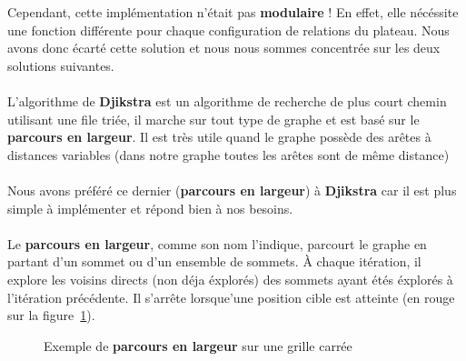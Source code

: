 \documentclass{article}
\begin{document}
Cependant, cette implémentation n'était pas \textbf{modulaire} ! En effet, elle nécéssite une fonction différente pour chaque configuration de relations du plateau.
Nous avons donc écarté cette solution et nous nous sommes concentrée sur les deux solutions suivantes.
\\\\
L'algorithme de \textbf{Djikstra} est un algorithme de recherche de plus court chemin utilisant une file triée, 
il marche sur tout type de graphe et est basé sur le \textbf{parcours en largeur}.
Il est très utile quand le graphe possède des arêtes à distances variables (dans notre graphe toutes les arêtes sont de même distance)
\\\\
Nous avons préféré ce dernier (\textbf{parcours en largeur}) à \textbf{Djikstra} car il est plus simple à implémenter et répond bien à nos besoins.
\\\\
Le \textbf{parcours en largeur}, comme son nom l'indique, parcourt le graphe en partant d'un sommet ou d'un ensemble de sommets.
\`{A} chaque itération, il explore les voisins directs (non déja éxplorés) des sommets ayant étés éxplorés à l'itération précédente.
Il s'arrête lorsque'une position cible est atteinte (en rouge sur la figure~\ref{bfs}).

\begin{figure}[h]
    \centering
    \hfill
    \hfill
    \caption{Exemple de \textbf{parcours en largeur} sur une grille carrée}
    \label{bfs}
\end{figure}
\end{document}
